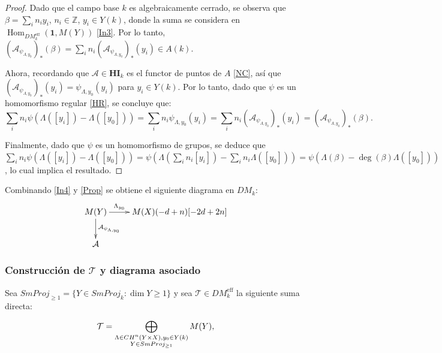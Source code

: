 \documentclass[10pt]{amsart}
\theoremstyle{definition}
\theoremstyle{remark}
\theoremstyle{definition}
\begin{document}
\begin{proof}
Dado que el campo base $k$ es algebraicamente cerrado, se observa que $\beta=\sum_{i}n_{i}y_{i}$, $n_{i}\in\mathbb{Z}$, $y_{i}\in Y(k)$, donde la suma se considera en $\operatorname{Hom}_{DM^{\mathrm{eff}}_{k}}(\mathbf{1},M(Y))$ \ref{In3}. Por lo tanto, $(\mathcal{A}_{\psi_{\Lambda,y_{0}}})_{*}(\beta)=\sum_{i}n_{i}(\mathcal{A}_{\psi_{ \Lambda,y_{0}}})_{*}(y_{i})\in A(k)$.

Ahora, recordando que $\mathcal{A}\in\mathbf{HI}_{k}$ es el functor de puntos de $A$ \ref{NC}, así que $(\mathcal{A}_{\psi_{\Lambda,y_{0}}})_{*}(y_{i})=\psi_{\Lambda,y_{0}}(y_{i})$ para $y_{i}\in Y(k)$. Por lo tanto, dado que $\psi$ es un homomorfismo regular \ref{HR}, se concluye que:
\[
\sum_{i}n_{i}\psi(\Lambda([y_{i}])-\Lambda([y_{0}]))=\sum_{i}n_{i}\psi_{\Lambda ,y_{0}}(y_{i})=\sum_{i}n_{i}(\mathcal{A}_{\psi_{\Lambda,y_{0}}})_{*}(y_{i})=( \mathcal{A}_{\psi_{\Lambda,y_{0}}})_{*}(\beta).
\]

Finalmente, dado que $\psi$ es un homomorfismo de grupos, se deduce que $\sum_{i}n_{i}\psi(\Lambda([y_{i}])-\Lambda([y_{0}]))=\psi(\Lambda(\sum_{i}n_{i}[ y_{i}])-\sum_{i}n_{i}\Lambda([y_{0}]))=\psi(\Lambda(\beta)-\deg(\beta)\Lambda([y _{0}]))$, lo cual implica el resultado.
\end{proof}

Combinando \ref{In4} y \ref{Prop} se obtiene el siguiente diagrama en $DM_{k}$:
\begin{align}\label{ind.reg.B}
\begin{split}
\xymatrix{M(Y) \ar[r]^-{\Lambda _{y_0}}
\ar[d]^-{\mathcal A 
_{\psi_{\Lambda, y_0}}}& M(X)(-d+n)[-2d+2n]\\
\mathcal A &}
\end{split}
\end{align}


\subsubsection{Construcción de $\mathcal{T}$ y diagrama asociado}\label{ind.reg.B1}

Sea $SmProj_{\geq 1}=\{Y\in SmProj_{k}:\dim Y\geq 1\}$ y sea $\mathcal{T}\in DM^{\mathrm{eff}}_{k}$ la siguiente suma directa:

\[
\mathcal{T}=\bigoplus_{\begin{subarray}{c}\Lambda\in CH^{n}(Y\times X),y_{0} \in Y(k)\\ Y\in SmProj_{\geq 1}\end{subarray}}M(Y),
\]
\end{document}
